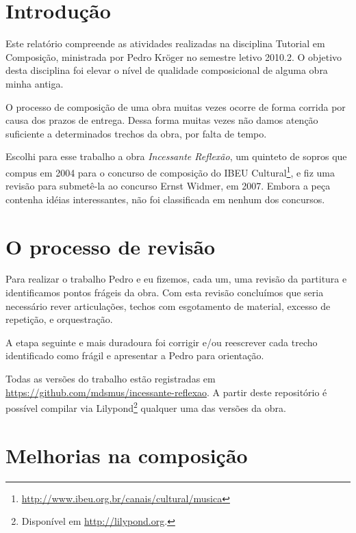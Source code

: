 \documentclass[10pt]{article}
\newcommand{\piece}[0]{\textit{Incessante Reflexão}}
\begin{document}

\section{Introdução}
\label{sec:introducao}

Este relatório compreende as atividades realizadas na disciplina
Tutorial em Composição, ministrada por Pedro Kröger no semestre letivo
2010.2.
O objetivo desta disciplina foi elevar o nível de qualidade
composicional de alguma obra minha antiga.

O processo de composição de uma obra muitas vezes ocorre de forma
corrida por causa dos prazos de entrega. Dessa forma muitas vezes não
damos atenção suficiente a determinados trechos da obra, por falta de
tempo.

Escolhi para esse trabalho a obra \piece{}, um quinteto de sopros que
compus em 2004 para o concurso de composição do IBEU
Cultural\footnote{\url{http://www.ibeu.org.br/canais/cultural/musica}},
e fiz uma revisão para submetê-la ao concurso Ernst Widmer, em
2007. Embora a peça contenha idéias interessantes, não foi
classificada em nenhum dos concursos.

\section{O processo de revisão}
\label{sec:o-processo-de}

Para realizar o trabalho Pedro e eu fizemos, cada um, uma revisão da
partitura e identificamos pontos frágeis da obra. Com esta revisão
concluímos que seria necessário rever articulações, techos com
esgotamento de material, excesso de repetição, e orquestração.

A etapa seguinte e mais duradoura foi corrigir e/ou reescrever cada
trecho identificado como frágil e apresentar a Pedro para orientação.

Todas as versões do trabalho estão registradas em
\url{https://github.com/mdsmus/incessante-reflexao}. A partir deste
repositório é possível compilar via Lilypond\footnote{Disponível em
  \url{http://lilypond.org}.} qualquer uma das versões da obra.

\section{Melhorias na composição}
\label{sec:melh-na-comp}
\end{document}

